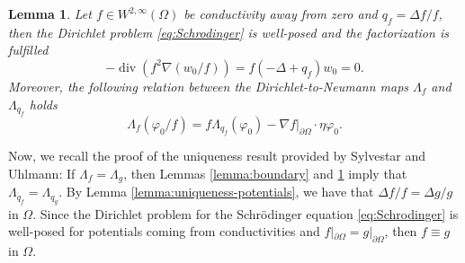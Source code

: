 \documentclass[12pt]{article}
\newtheorem{lemma}[theorem]{Lemma}
\begin{document}
\begin{lemma}\label{lemma-D-N}
Let $f\in W^{2,\infty}(\Omega)$ be conductivity away from zero and $q_f=\Delta f/f$, then the Dirichlet problem \eqref{eq:Schrodinger} is well-posed and the factorization is fulfilled
\[
-\operatorname{div} \left(f^2\nabla (w_0/f)\right)=f\left(-\Delta+q_f\right)w_0=0.
\]
Moreover, the following relation between the Dirichlet-to-Neumann maps $\Lambda_f$ and $\Lambda_{q_f}$ holds
\begin{equation}\label{eq:D-N-relation}
    \Lambda_{f}(\varphi_0/f)=f \Lambda_{q_f}(\varphi_0)-\nabla f|_{\partial\Omega}\cdot \eta \varphi_0.
\end{equation}
\end{lemma}
Now, we recall the proof of the uniqueness result provided by Sylvestar and Uhlmann: If $\Lambda_f=\Lambda_g$, then Lemmas \ref{lemma:boundary} and \ref{lemma-D-N} imply that $\Lambda_{q_f}=\Lambda_{q_g}$. By Lemma \ref{lemma:uniqueness-potentials}, we have that $\Delta f/f=\Delta g/g$ in $\Omega$. Since the Dirichlet problem for the Schr\"{o}dinger equation \eqref{eq:Schrodinger} is well-posed for potentials coming from conductivities and $f|_{\partial\Omega}=g|_{\partial\Omega}$, then $f\equiv g$ in $\Omega$.
\end{document}
